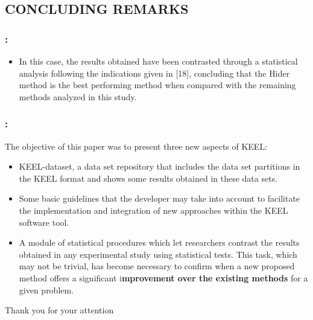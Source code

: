 \documentclass{beamer}
\begin{document}
\begin{CJK*}{UTF8}{bsmi}
\section{CONCLUDING REMARKS} 

\begin{frame}
	\frametitle{\insertsection : \insertsubsection}

	\begin{itemize}
		\item In this case, the results obtained have been contrasted through a statistical analysis following the indications given in [18], concluding that the Hider method is the best performing method when compared with the remaining methods analyzed in this study.
	\end{itemize}
	
	
\end{frame}

\begin{frame}
	\frametitle{\insertsection : \insertsubsection}
	The objective of this paper was to present three new aspects of KEEL:
	
	\begin{itemize}
		\item KEEL-dataset, a data set repository that includes the data set partitions in the KEEL format and shows some results obtained in these data sets.
		\item Some basic guidelines that the developer may take into account to facilitate the implementation and integration of new approaches within the KEEL software tool. 
		\item A module of statistical procedures which let researchers contrast the results obtained in any experimental study using statistical tests. This task, which may not be trivial, has become necessary to confirm when a new proposed method offers a significant i\textbf{mprovement over the existing methods} for a given problem.
	\end{itemize}
	
	
\end{frame}


\begin{frame}
\Huge{\centerline{Thank you for your attention}}
\end{frame}


\clearpage\end{CJK*}
\end{document}
